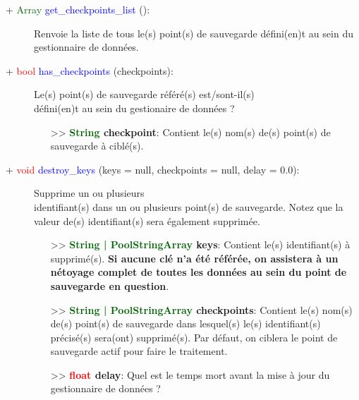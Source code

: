 \documentclass[a4paper, 11pt]{article}
\begin{document}
	\begin{description}
		\item [+ \textcolor{darkgreen}{Array} \textcolor{blue}{get\_checkpoints\_list} ():] Renvoie la liste
		de tous le(s) point(s) de sauvegarde défini(en)t au sein du gestionnaire de données.\\
	\end{description}
	\begin{description}
		\item [+ \textcolor{red}{bool} \textcolor{blue}{has\_checkpoints} (checkpoints):] Le(s) point(s) de
		sauvegarde référé(s) est/sont-il(s) \\défini(en)t au sein du gestionaire de données ?
		\begin{itemize}
			\item [>> \textbf{\textcolor{darkgreen}{String} checkpoint}:] Contient le(s) nom(s) de(s)
			point(s) de sauvegarde à ciblé(s).\\
		\end{itemize}
	\end{description}
	\begin{description}
		\item [+ \textcolor{red}{void} \textcolor{blue}{destroy\_keys} (keys = null, checkpoints = null,
		delay = 0.0):] Supprime un ou plusieurs \\identifiant(s) dans un ou plusieurs point(s) de 
		sauvegarde. Notez que la valeur de(s) identifiant(s) sera également supprimée.
		\begin{itemize}
			\item [>> \textbf{\textcolor{darkgreen}{String | PoolStringArray} keys}:] Contient le(s)
			identifiant(s) à supprimé(s). \textbf{Si aucune clé n'a été référée, on assistera à un nétoyage 
			complet de toutes les données au sein du point de sauvegarde en question}.
			\item [>> \textbf{\textcolor{darkgreen}{String | PoolStringArray} checkpoints}:] Contient le(s) 
			nom(s) de(s) point(s) de sauvegarde dans lesquel(s) le(s) identifiant(s) précisé(s) sera(ont)
			supprimé(s). Par défaut, on ciblera le point de sauvegarde actif pour faire le traitement.
			\item [>> \textbf{\textcolor{red}{float} delay}:] Quel est le temps mort avant la mise à jour du
			gestionnaire de données ?\\
		\end{itemize}
	\end{description}
\end{document}
